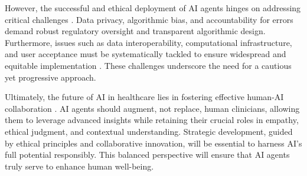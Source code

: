 \documentclass[12pt,a4paper]{article}
\begin{document}
However, the successful and ethical deployment of AI agents hinges on addressing critical challenges \cite{nih_ethical_implications}. Data privacy, algorithmic bias, and accountability for errors demand robust regulatory oversight and transparent algorithmic design. Furthermore, issues such as data interoperability, computational infrastructure, and user acceptance must be systematically tackled to ensure widespread and equitable implementation \cite{dataart_digital_transformation}. These challenges underscore the need for a cautious yet progressive approach.

Ultimately, the future of AI in healthcare lies in fostering effective human-AI collaboration \cite{nih_ethical_implications}. AI agents should augment, not replace, human clinicians, allowing them to leverage advanced insights while retaining their crucial roles in empathy, ethical judgment, and contextual understanding. Strategic development, guided by ethical principles and collaborative innovation, will be essential to harness AI's full potential responsibly. This balanced perspective will ensure that AI agents truly serve to enhance human well-being.

\printbibliography[heading=bibintoc]
\end{document}
